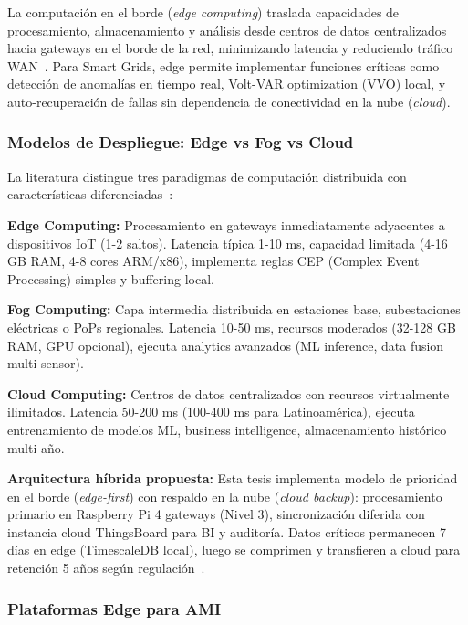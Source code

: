 La computación en el borde (\textit{edge computing}) traslada capacidades de procesamiento, almacenamiento y análisis desde centros de datos centralizados hacia gateways en el borde de la red, minimizando latencia y reduciendo tráfico WAN~\cite{liangReviewEdgeComputing2024,satyanarayananEmergenceEdgeComputing2017}. Para Smart Grids, edge permite implementar funciones críticas como detección de anomalías en tiempo real, Volt-VAR optimization (VVO) local, y auto-recuperación de fallas sin dependencia de conectividad en la nube (\textit{cloud}).

\subsubsection{Modelos de Despliegue: Edge vs Fog vs Cloud}

La literatura distingue tres paradigmas de computación distribuida con características diferenciadas~\cite{liangReviewEdgeComputing2024}:

\textbf{Edge Computing:} Procesamiento en gateways inmediatamente adyacentes a dispositivos IoT (1-2 saltos). Latencia típica 1-10 ms, capacidad limitada (4-16 GB RAM, 4-8 cores ARM/x86), implementa reglas CEP (Complex Event Processing) simples y buffering local.

\textbf{Fog Computing:} Capa intermedia distribuida en estaciones base, subestaciones eléctricas o PoPs regionales. Latencia 10-50 ms, recursos moderados (32-128 GB RAM, GPU opcional), ejecuta analytics avanzados (ML inference, data fusion multi-sensor).

\textbf{Cloud Computing:} Centros de datos centralizados con recursos virtualmente ilimitados. Latencia 50-200 ms (100-400 ms para Latinoamérica), ejecuta entrenamiento de modelos ML, business intelligence, almacenamiento histórico multi-año.

\textbf{Arquitectura híbrida propuesta:} Esta tesis implementa modelo de prioridad en el borde (\textit{edge-first}) con respaldo en la nube (\textit{cloud backup}): procesamiento primario en Raspberry Pi 4 gateways (Nivel 3), sincronización diferida con instancia cloud ThingsBoard para BI y auditoría. Datos críticos permanecen 7 días en edge (TimescaleDB local), luego se comprimen y transfieren a cloud para retención 5 años según regulación~\cite{alsafranChallengesImplementingIoT2025}.

\subsubsection{Plataformas Edge para AMI}


